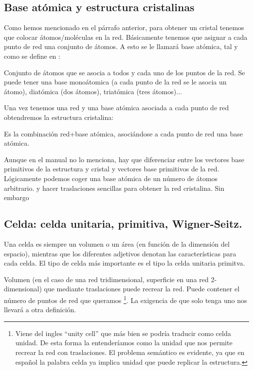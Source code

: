 \subsection{Base atómica y estructura cristalinas}

Como hemos mencionado en el párrafo anterior, para obtener un cristal tenemos que colocar átomos/moléculas en la red. Básicamente tenemos que asignar a cada punto de red una conjunto de átomos. A esto se le llamará base atómica, tal y como se define en \cite{Fisica_del_Estado_Solido}:

\begin{definition}
    Conjunto de átomos que se asocia a todos y cada uno de los puntos de la red. Se puede tener una base monoátomica (a cada punto de la red se le asocia un átomo), diatómica (dos átomos), triatómica (tres átomos)...
    \label{Def:01-Base_atomica}
\end{definition}

Una vez tenemos una red y una base atómica asociada a cada punto de red obtendremos la estructura cristalina:

\begin{definition}
    Es la combinación red+base atómica, asociándose a cada punto de red una base atómica. 
\end{definition}

Aunque en el manual \cite{Fisica_del_Estado_Solido} no lo menciona, hay que diferenciar entre los vectores base primitivos de la estructura y cristal y vectores base primitivos de la red. Lógicamente podemos coger una base atómica de un número de átomos arbitrario. y hacer traslaciones sencillas para obtener la red cristalina. Sin embargo 

\subsection{Celda: celda unitaria, primitiva, Wigner-Seitz.}

Una celda es siempre un volumen o un área (en función de la dimensión del espacio), mientras que los diferentes adjetivos denotan las características para cada celda. El tipo de celda más importante es el tipo la celda unitaria primitva.

\begin{definition}
	Volumen (en el caso de una red tridimensional, superficie en una red 2-dimensional) que mediante traslaciones puede recrear la red. Puede contener el número de puntos de red que queramos \footnote{Viene del ingles ``unity cell'' que más bien se podría traducir como celda unidad. De esta forma la entenderíamos como la unidad que nos permite recrear la red con traslaciones. El problema semántico es evidente, ya que en español la palabra celda ya implica unidad que puede replicar la estructura.}. La exigencia de que solo tenga uno nos llevará a otra definición.
\end{definition}


